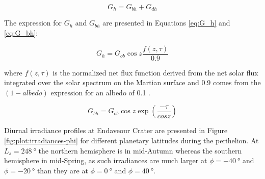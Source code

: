 \begin{equation}
  \label{eq:G_h_1}
  G_{h} = G_{bh} + G_{dh}
\end{equation}

The expression for $G_{h}$ and $G_{bh}$ are presented in Equations \ref{eq:G_h} and \ref{eq:G_bh}:

\begin{equation}
  \label{eq:G_h_2}
  G_{h} = G_{ob}\cos{z}\frac{f(z,\tau)}{0.9}
\end{equation}

where $f(z,\tau)$ is the normalized net flux function derived from the net solar flux integrated over the solar spectrum on the Martian surface and 0.9 comes from the $(1-albedo)$ expression for an albedo of 0.1 .

\begin{equation}
  \label{eq:G_bh}
  G_{bh} = G_{ob}\cos{z}\exp\left(\frac{-\tau}{cos{z}}\right)
\end{equation}

Diurnal irradiance profiles at Endaveour Crater are presented in Figure \ref{fig:plot:irradiances-phi} for different planetary latitudes during the perihelion. At $L_{s} = \SI{248}{\degree}$ the northern hemisphere is in mid-Autumn whereas the southern hemisphere in mid-Spring, as such irradiances are much larger at $\phi = \SI{-40}{\degree}$ and $\phi = \SI{-20}{\degree}$ than they are at $\phi = \SI{0}{\degree}$ and $\phi = \SI{40}{\degree}$.


